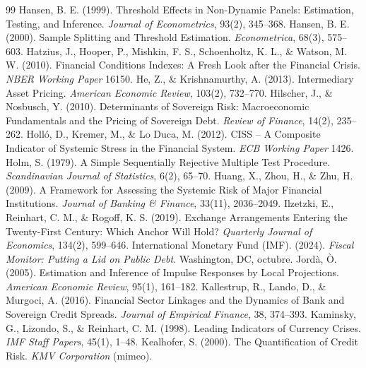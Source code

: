 \begin{thebibliography}{99}
 Hansen, B. E. (1999). Threshold Effects in Non-Dynamic Panels: Estimation, Testing, and Inference. \textit{Journal of Econometrics}, 93(2), 345--368.
 Hansen, B. E. (2000). Sample Splitting and Threshold Estimation. \textit{Econometrica}, 68(3), 575--603.
 Hatzius, J., Hooper, P., Mishkin, F. S., Schoenholtz, K. L., \& Watson, M. W. (2010). Financial Conditions Indexes: A Fresh Look after the Financial Crisis. \textit{NBER Working Paper} 16150.
 He, Z., \& Krishnamurthy, A. (2013). Intermediary Asset Pricing. \textit{American Economic Review}, 103(2), 732--770.
 Hilscher, J., \& Nosbusch, Y. (2010). Determinants of Sovereign Risk: Macroeconomic Fundamentals and the Pricing of Sovereign Debt. \textit{Review of Finance}, 14(2), 235--262.
 Holló, D., Kremer, M., \& Lo Duca, M. (2012). CISS -- A Composite Indicator of Systemic Stress in the Financial System. \textit{ECB Working Paper} 1426.
 Holm, S. (1979). A Simple Sequentially Rejective Multiple Test Procedure. \textit{Scandinavian Journal of Statistics}, 6(2), 65--70.
 Huang, X., Zhou, H., \& Zhu, H. (2009). A Framework for Assessing the Systemic Risk of Major Financial Institutions. \textit{Journal of Banking \& Finance}, 33(11), 2036--2049.
 Ilzetzki, E., Reinhart, C. M., \& Rogoff, K. S. (2019). Exchange Arrangements Entering the Twenty-First Century: Which Anchor Will Hold? \textit{Quarterly Journal of Economics}, 134(2), 599--646.
 International Monetary Fund (IMF). (2024). \textit{Fiscal Monitor: Putting a Lid on Public Debt}. Washington, DC, octubre.
 Jordà, Ò. (2005). Estimation and Inference of Impulse Responses by Local Projections. \textit{American Economic Review}, 95(1), 161--182.
 Kallestrup, R., Lando, D., \& Murgoci, A. (2016). Financial Sector Linkages and the Dynamics of Bank and Sovereign Credit Spreads. \textit{Journal of Empirical Finance}, 38, 374--393.
 Kaminsky, G., Lizondo, S., \& Reinhart, C. M. (1998). Leading Indicators of Currency Crises. \textit{IMF Staff Papers}, 45(1), 1--48.
 Kealhofer, S. (2000). The Quantification of Credit Risk. \textit{KMV Corporation} (mimeo).

\end{thebibliography}
